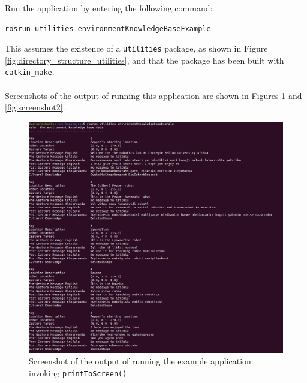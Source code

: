 \documentclass{CSSRforAfrica}
\begin{document}
\noindent
Run the application by entering the following command:
\begin{lstlisting}[style=withoutNumbering, language=bash]
rosrun utilities environmentKnowledgeBaseExample
\end{lstlisting}
This assumes the existence of a {\small \tt utilities} package, as shown in Figure  \ref{fig:directory_structure_utilities}, and that the package has been built with {\small \tt catkin\_make}. \\~\\
Screenshots of the output of running this application are shown in Figures \ref{fig:screenshot1} and \ref{fig:screenshot2}.
 
\newpage
\begin{figure}[H]
\begin{center}
\vspace{-2mm}
\includegraphics[width=\linewidth,angle=0]{screenshot1.png}
\end{center}
\vspace{-6mm}
\caption{Screenshot of  the output of running the example  application: invoking {\small \tt printToScreen()}.}
\label{fig:screenshot1}       
\end{figure}
\end{document}
